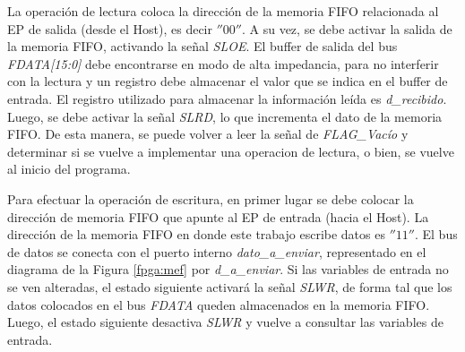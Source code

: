 La operación de lectura coloca la dirección de la memoria FIFO relacionada al EP de salida (desde el Host), es decir $''00''$. A su vez, se debe activar la salida de la memoria FIFO, activando la señal {\it SLOE}. El buffer de salida del bus {\it FDATA[15:0]} debe encontrarse en modo de alta impedancia, para no interferir con la lectura y un registro debe almacenar el valor que se indica en el buffer de entrada. El registro utilizado para almacenar la información leída es {\it d\_recibido}. Luego, se debe activar la señal {\it SLRD}, lo que incrementa el dato de la memoria FIFO. De esta manera, se puede volver a leer la señal de {\it FLAG\_Vacío} y determinar si se vuelve a implementar una operacion de lectura, o bien, se vuelve al inicio del programa.
 
Para efectuar la operación de escritura, en primer lugar se debe colocar la dirección de memoria FIFO que apunte al EP de entrada (hacia el Host). La dirección de la memoria FIFO en donde este trabajo escribe datos es $''11''$.  El bus de datos se conecta con el puerto interno {\it dato\_a\_enviar}, representado en el diagrama de la Figura \ref{fpga:mef} por {\it d\_a\_enviar}. Si las variables de entrada no se ven alteradas, el estado siguiente activará la señal {\it SLWR}, de forma tal que los datos colocados en el bus {\it FDATA }queden almacenados en la memoria FIFO. Luego, el estado siguiente desactiva {\it SLWR} y vuelve a consultar las variables de entrada.

%

